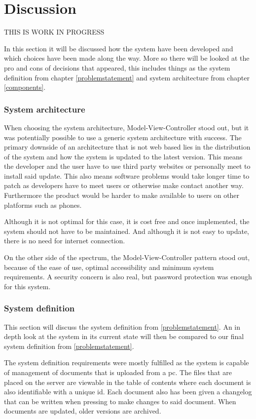 \chapter{Discussion}
THIS IS WORK IN PROGRESS

In this section it will be discussed how the system have been developed and which choices have been made along the way. More so there will be looked at the pro and cons of decisions that appeared, this includes things as the system definition from chapter \cref{problemstatement} and system architecture from chapter \cref{components}.

\subsection{System architecture}
When choosing the system architecture, Model-View-Controller stood out, but it was potentially possible to use a generic system architecture with success. The primary downside of an architecture that is not web based lies in the distribution of the system and how the system is updated to the latest version. This means the developer and the user have to use third party websites or personally meet to install said update. This also means software problems would take longer time to patch as developers have to meet users or otherwise make contact another way. Furthermore the product would be harder to make available to users on other platforms such as phones.

Although it is not optimal for this case, it is cost free and once implemented, the system should not have to be maintained. And although it is not easy to update, there is no need for internet connection.

On the other side of the spectrum, the Model-View-Controller pattern stood out, because of the ease of use, optimal accessibility and minimum system requirements. A security concern is also real, but password protection was enough for this system.

\subsection{System definition}
This section will discuss the system definition from \cref{problemstatement}. An in depth look at the system in its current state will then be compared to our final system definition from \cref{problemstatement}.

The system definition requirements were mostly fulfilled as the system is capable of management of documents that is uploaded from a pc. The files that are placed on the server are viewable in the table of contents where each document is also identifiable with a unique id. Each document also has been given a changelog that can be written when pressing to make changes to said document. When documents are updated, older versions are archived.

